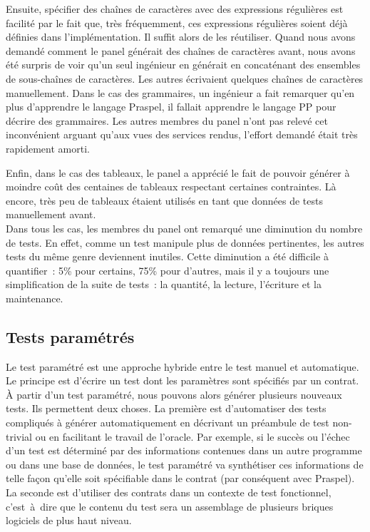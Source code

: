 Ensuite, spécifier des chaînes de caractères avec des expressions régulières est
facilité par le fait que, très fréquemment, ces expressions régulières soient
déjà définies dans l'implémentation. Il suffit alors de les réutiliser.  Quand
nous avons demandé comment le panel générait des chaînes de caractères avant,
nous avons été surpris de voir qu'un seul ingénieur en générait en concaténant
des ensembles de sous-chaînes de caractères. Les autres écrivaient quelques
chaînes de caractères manuellement. Dans le cas des grammaires, un ingénieur a
fait remarquer qu'en plus d'apprendre le langage Praspel, il fallait apprendre
le langage PP pour décrire des grammaires. Les autres membres du panel n'ont pas
relevé cet inconvénient arguant qu'aux vues des services rendus, l'effort
demandé était très rapidement amorti.

Enfin, dans le cas des tableaux, le panel a apprécié le fait de pouvoir générer
à moindre coût des centaines de tableaux respectant certaines contraintes. Là
encore, très peu de tableaux étaient utilisés en tant que données de tests
manuellement avant. \\

Dans tous les cas, les membres du panel ont remarqué une diminution du nombre de
tests. En effet, comme un test manipule plus de données pertinentes, les autres
tests du même genre deviennent inutiles. Cette diminution a été difficile à
quantifier~: 5\% pour certains, 75\% pour d'autres, mais il y a toujours une
simplification de la suite de tests~: la quantité, la lecture, l'écriture et la
maintenance.

\subsection{Tests paramétrés}


Le test paramétré est une approche hybride entre le test manuel et automatique.
Le principe est d'écrire un test dont les paramètres sont spécifiés par un
contrat. À partir d'un test paramétré, nous pouvons alors générer plusieurs
nouveaux tests. Ils permettent deux choses. La première est d'automatiser des
tests compliqués à générer automatiquement en décrivant un préambule de test
non-trivial ou en facilitant le travail de l'oracle. Par exemple, si le succès
ou l'échec d'un test est déterminé par des informations contenues dans un autre
programme ou dans une base de données, le test paramétré va synthétiser ces
informations de telle façon qu'elle soit spécifiable dans le contrat (par
conséquent avec Praspel). La seconde est d'utiliser des contrats dans un
contexte de test fonctionnel, c'est~à~dire que le contenu du test sera un
assemblage de plusieurs briques logiciels de plus haut niveau.

